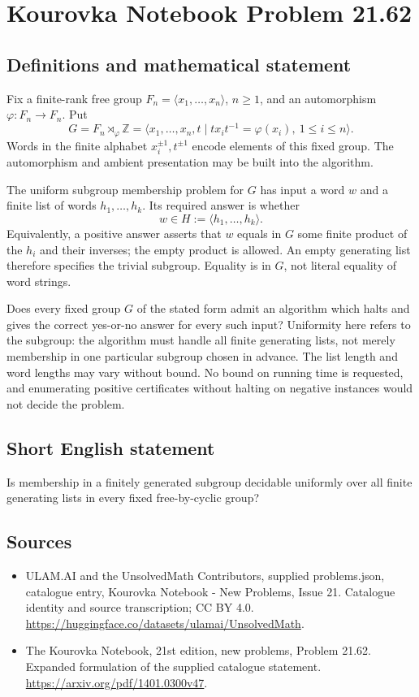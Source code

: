 \documentclass[11pt,a4paper]{article}
\begin{document}
\section*{Kourovka Notebook Problem 21.62}\label{statement}

\subsection{Definitions and mathematical statement}
Fix a finite-rank free group $F_n=\langle x_1,\ldots,x_n\rangle$,
$n\ge1$, and an automorphism $\varphi:F_n\to F_n$. Put
\[
 G=F_n\rtimes_\varphi\mathbb Z
 =\langle x_1,\ldots,x_n,t\mid
       tx_it^{-1}=\varphi(x_i),\ 1\le i\le n\rangle.
\]
Words in the finite alphabet $x_i^{\pm1},t^{\pm1}$ encode elements of
this fixed group. The automorphism and ambient presentation may be
built into the algorithm.

The uniform subgroup membership problem for $G$ has input a word $w$
and a finite list of words $h_1,\ldots,h_k$. Its required answer is
whether
\[
 w\in H:=\langle h_1,\ldots,h_k\rangle.
\]
Equivalently, a positive answer asserts that $w$ equals in $G$ some
finite product of the $h_i$ and their inverses; the empty product is
allowed. An empty generating list therefore specifies the trivial
subgroup. Equality is in $G$, not literal equality of word strings.

Does every fixed group $G$ of the stated form admit an algorithm
which halts and gives the correct yes-or-no answer for every such
input? Uniformity here refers to the subgroup: the algorithm must
handle all finite generating lists, not merely membership in one
particular subgroup chosen in advance. The list length and word
lengths may vary without bound. No bound on running time is requested,
and enumerating positive certificates without halting on negative
instances would not decide the problem.
\subsection{Short English statement}
Is membership in a finitely generated subgroup decidable uniformly over all finite generating lists in every fixed free-by-cyclic group?
\subsection{Sources}
\begin{itemize}
\item[S1] ULAM.AI and the UnsolvedMath Contributors, supplied problems.json, catalogue entry, Kourovka Notebook - New Problems, Issue 21. Catalogue identity and source transcription; CC BY 4.0.
\url{https://huggingface.co/datasets/ulamai/UnsolvedMath}.
\item[S2] The Kourovka Notebook, 21st edition, new problems, Problem 21.62. Expanded formulation of the supplied catalogue statement.
\url{https://arxiv.org/pdf/1401.0300v47}.
\end{itemize}
\end{document}
